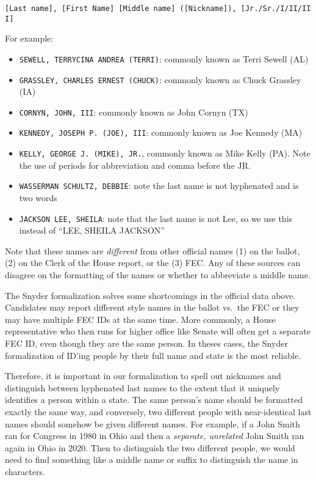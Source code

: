 \documentclass[12pt]{article}
\begin{document}
\begin{itemize}[leftmargin=*]
\texttt{{[}Last\ name{]},\ {[}First\ Name{]}\ {[}Middle\ name{]}\ ({[}Nickname{]}),\ {[}Jr./Sr./I/II/III{]}}

For example:

\begin{itemize}
\tightlist
\item
  \texttt{SEWELL,\ TERRYCINA\ ANDREA\ (TERRI)}: commonly known as Terri
  Sewell (AL)
\item
  \texttt{GRASSLEY,\ CHARLES\ ERNEST\ (CHUCK)}: commonly known as Chuck
  Grassley (IA)
\item
  \texttt{CORNYN,\ JOHN,\ III}: commonly known as John Cornyn (TX)
\item
  \texttt{KENNEDY,\ JOSEPH\ P.\ (JOE),\ III}: commonly known as Joe
  Kennedy (MA)
\item
  \texttt{KELLY,\ GEORGE\ J.\ (MIKE),\ JR.}, commonly known as Mike
  Kelly (PA). Note the use of periods for abbreviation and comma before
  the JR.
\item
  \texttt{WASSERMAN\ SCHULTZ,\ DEBBIE}: note the last name is not
  hyphenated and is two words
\item
  \texttt{JACKSON\ LEE,\ SHEILA}: note that the last name is not Lee, so
  we use this instead of ``LEE, SHEILA JACKSON''
\end{itemize}

Note that these names are \emph{different} from other official names (1)
on the ballot, (2) on the Clerk of the House report, or the (3) FEC. Any
of these sources can disagree on the formatting of the names or whether
to abbreviate a middle name.

The Snyder formalization solves some shortcomings in the official data
above. Candidates may report different style names in the ballot vs.~the
FEC or they may have multiple FEC IDs at the same time. More commonly, a
House representative who then runs for higher office like Senate will
often get a separate FEC ID, even though they are the same person. In
theses cases, the Snyder formalization of ID'ing people by their full
name and state is the most reliable.

Therefore, it is important in our formalization to spell out nicknames
and distinguish between hyphenated last names to the extent that it
uniquely identifies a person within a state. The same person's name
should be formatted exactly the same way, and conversely, two different
people with near-identical last names should somehow be given
{different} names. For example, if a John Smith ran for Congress
in 1980 in Ohio and then a \emph{separate, unrelated} John Smith ran
again in Ohio in 2020. Then to distinguish the two different people, we
would need to find {something} like a middle name or suffix to
distinguish the name in characters.


\end{itemize}
\end{document}
